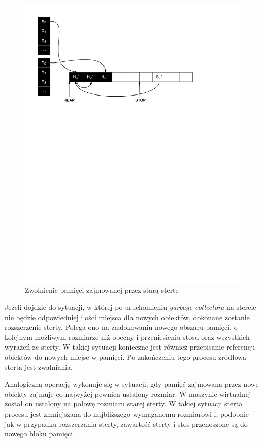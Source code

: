\begin{figure}[h]
\centerline{\includegraphics[scale=0.75, clip, trim=10mm 180mm 45mm 10mm]{gc_6}}
\caption{Zwolnienie pamięci zajmowanej przez starą stertę}
\label{fig:gc6}
\end{figure}

Jeżeli dojdzie do sytuacji, w której po uruchomieniu \emph{garbage collectora} na stercie nie będzie odpowiedniej ilości miejsca dla nowych obiektów, dokonane zostanie rozszerzenie sterty. Polega ono na zaalokowaniu nowego obszaru pamięci, o kolejnym możliwym rozmiarze niż obecny i przeniesieniu stosu oraz wszystkich wyrażeń ze sterty.
W takiej sytuacji konieczne jest również przepisanie referencji obiektów do nowych miejsc w pamięci.
Po zakończeniu tego procesu źródłowa sterta jest zwalniania.

Analogiczną operację wykonuje się w sytuacji, gdy pamięć zajmowana przez nowe obiekty zajmuje co najwyżej pewnien ustalony rozmiar.
W maszynie wirtualnej został on ustalony na połowę rozmiaru starej sterty.
W takiej sytuacji sterta procesu jest zmniejszana do najbliższego wymaganemu rozmiarowi i, podobnie jak w przypadku rozszerzania sterty, zawartość sterty i stos przenoszone są do nowego bloku pamięci.

